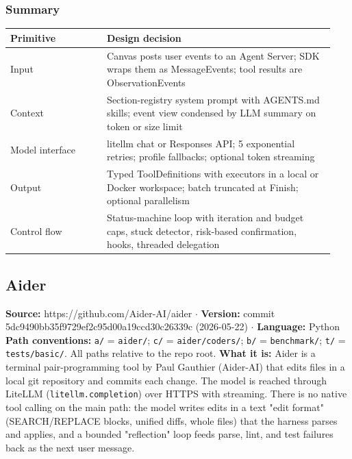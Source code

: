 \subsubsection*{Summary}
\begin{longtable}{@{}p{0.28\linewidth}p{0.66\linewidth}@{}}
\toprule \textbf{Primitive} & \textbf{Design decision} \\ \midrule \endhead
Input & Canvas posts user events to an Agent Server; SDK wraps them as MessageEvents; tool results are ObservationEvents \\
Context & Section-registry system prompt with AGENTS.md skills; event view condensed by LLM summary on token or size limit \\
Model interface & litellm chat or Responses API; 5 exponential retries; profile fallbacks; optional token streaming \\
Output & Typed ToolDefinitions with executors in a local or Docker workspace; batch truncated at Finish; optional parallelism \\
Control flow & Status-machine loop with iteration and budget caps, stuck detector, risk-based confirmation, hooks, threaded delegation \\
\bottomrule \end{longtable}


\subsection{Aider}

\textbf{Source:} https://github.com/Aider-AI/aider $\cdot$ \textbf{Version:} commit 5dc9490bb35f9729ef2c95d00a19ccd30c26339c (2026-05-22) $\cdot$ \textbf{Language:} Python
\textbf{Path conventions:} \texttt{a/\allowbreak{}} = \texttt{aider/\allowbreak{}}; \texttt{c/\allowbreak{}} = \texttt{aider/\allowbreak{}coders/\allowbreak{}}; \texttt{b/\allowbreak{}} = \texttt{benchmark/\allowbreak{}}; \texttt{t/\allowbreak{}} = \texttt{tests/\allowbreak{}basic/\allowbreak{}}. All paths relative to the repo root.
\textbf{What it is:} Aider is a terminal pair-programming tool by Paul Gauthier (Aider-AI) that edits files in a local git repository and commits each change. The model is reached through LiteLLM (\texttt{litellm.\allowbreak{}completion}) over HTTPS with streaming. There is no native tool calling on the main path: the model writes edits in a text "edit format" (SEARCH/REPLACE blocks, unified diffs, whole files) that the harness parses and applies, and a bounded "reflection" loop feeds parse, lint, and test failures back as the next user message.

